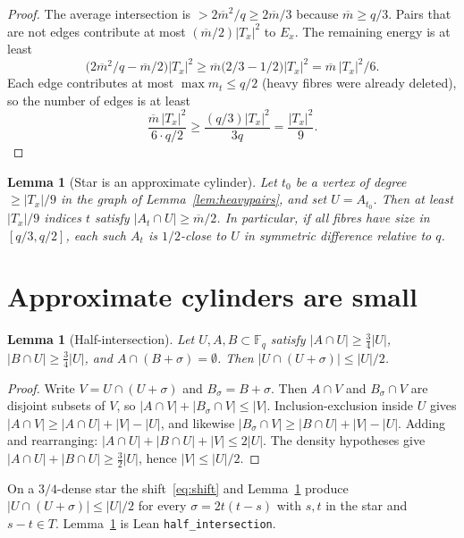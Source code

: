 \documentclass[11pt]{article}
\newtheorem{lemma}[theorem]{Lemma}
\theoremstyle{definition}
\newcommand{\F}{\mathbb{F}}
\begin{document}
\begin{proof}
The average intersection is $>2\overline m^{2}/q\ge 2\overline m/3$ because $\overline m\ge q/3$.
Pairs that are not edges contribute at most $(\overline m/2)|T_x|^{2}$ to $E_x$.
The remaining energy is at least
\[
  \bigl(2\overline m^{2}/q-\overline m/2\bigr)|T_x|^{2}
  \ge
  \overline m\bigl(2/3-1/2\bigr)|T_x|^{2}
  =
  \overline m\,|T_x|^{2}/6.
\]
Each edge contributes at most $\max m_t\le q/2$ (heavy fibres were already deleted), so the number of edges is at least
\[
  \frac{\overline m\,|T_x|^{2}}{6\cdot q/2}
  \ge
  \frac{(q/3)|T_x|^{2}}{3q}
  =
  \frac{|T_x|^{2}}{9}.
\]
\end{proof}

\begin{lemma}[Star is an approximate cylinder]\label{lem:star}
Let $t_0$ be a vertex of degree $\ge|T_x|/9$ in the graph of Lemma~\ref{lem:heavypairs}, and set $U=A_{t_0}$.
Then at least $|T_x|/9$ indices $t$ satisfy $|A_t\cap U|\ge\overline m/2$.
In particular, if all fibres have size in $[q/3,q/2]$, each such $A_t$ is $1/2$-close to $U$ in symmetric difference relative to $q$.
\end{lemma}

\section{Approximate cylinders are small}

\begin{lemma}[Half-intersection]\label{lem:half}
Let $U,A,B\subset\F_q$ satisfy $|A\cap U|\ge\tfrac34|U|$, $|B\cap U|\ge\tfrac34|U|$, and $A\cap(B+\sigma)=\emptyset$.
Then $|U\cap(U+\sigma)|\le|U|/2$.
\end{lemma}

\begin{proof}
Write $V=U\cap(U+\sigma)$ and $B_{\sigma}=B+\sigma$.
Then $A\cap V$ and $B_{\sigma}\cap V$ are disjoint subsets of $V$, so $|A\cap V|+|B_{\sigma}\cap V|\le|V|$.
Inclusion-exclusion inside $U$ gives $|A\cap V|\ge|A\cap U|+|V|-|U|$, and likewise $|B_{\sigma}\cap V|\ge|B\cap U|+|V|-|U|$.
Adding and rearranging: $|A\cap U|+|B\cap U|+|V|\le 2|U|$.
The density hypotheses give $|A\cap U|+|B\cap U|\ge\tfrac32|U|$, hence $|V|\le|U|/2$.
\end{proof}

On a $3/4$-dense star the shift~\eqref{eq:shift} and Lemma~\ref{lem:half} produce $|U\cap(U+\sigma)|\le|U|/2$ for every $\sigma=2t(t-s)$ with $s,t$ in the star and $s-t\in T$.
Lemma~\ref{lem:half} is Lean \texttt{half\_intersection}.
\end{document}
